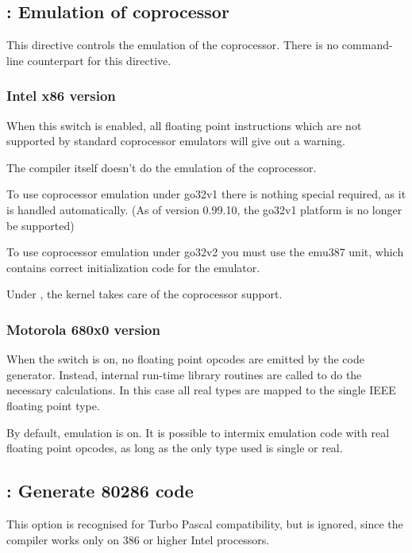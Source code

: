 \subsection{ : Emulation of coprocessor}

This directive controls the emulation of the coprocessor. There is no
command-line counterpart for this directive.

\subsubsection{Intel x86 version}

When this switch is enabled, all floating point instructions
which are not supported by standard coprocessor emulators will give out
a warning.

The compiler itself doesn't do the emulation of the coprocessor.

To use coprocessor emulation under \dos go32v1 there is nothing special
required, as it is handled automatically. (As of version 0.99.10, the
go32v1 platform is no longer be supported)

To use coprocessor emulation under \dos go32v2 you must use the
emu387 unit, which contains correct initialization code for the
emulator.

Under \linux, the kernel takes care of the coprocessor support.

\subsubsection{Motorola 680x0 version}

When the switch is on, no floating point opcodes are emitted
by the code generator. Instead, internal run-time library routines
are called to do the necessary calculations. In this case all
real types are mapped to the single IEEE floating point type.

\begin{remark}By default, emulation is on. It is possible to
intermix emulation code with real floating point opcodes, as
long as the only type used is single or real.
\end{remark}

\subsection{ : Generate 80286 code}

This option is recognised for Turbo Pascal compatibility, but is ignored,
since the compiler works only on 386 or higher Intel processors.

